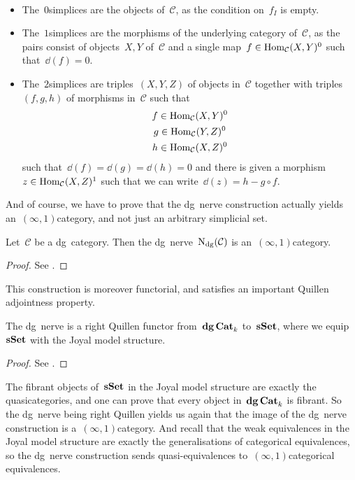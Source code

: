 \begin{example} {\ }
  \label{example:low-degree-interpretation}
  \begin{itemize}
    \item The~$0$\dash simplices are the objects of~$\mathcal{C}$, as the condition on~$f_I$ is empty.
    \item The~$1$\dash simplices are the morphisms of the underlying category of~$\mathcal{C}$, as the pairs consist of objects~$X,Y$ of~$\mathcal{C}$ and a single map~$f\in\mathrm{Hom}_{\mathcal{C}}(X,Y)^0$ such that~$\dd(f)=0$.
    \item The~$2$\dash simplices are triples~$(X,Y,Z)$ of objects in~$\mathcal{C}$ together with triples~$(f,g,h)$ of morphisms in~$\mathcal{C}$ such that
      \begin{equation}
        \begin{gathered}
          f\in\mathrm{Hom}_{\mathcal{C}}(X,Y)^0 \\
          g\in\mathrm{Hom}_{\mathcal{C}}(Y,Z)^0 \\
          h\in\mathrm{Hom}_{\mathcal{C}}(X,Z)^0 \\
        \end{gathered}
      \end{equation}
      such that~$\dd(f)=\dd(g)=\dd(h)=0$ and there is given a morphism~$z\in\mathrm{Hom}_{\mathcal{C}}(X,Z)^1$ such that we can write~$\dd(z)=h-g\circ f$.
  \end{itemize}
\end{example}
And of course, we have to prove that the dg~nerve construction actually yields an~$(\infty,1)$\dash category, and not just an arbitrary simplicial set.
\begin{proposition}
  Let~$\mathcal{C}$ be a dg~category. Then the dg~nerve~$\operatorname{N}_{\mathrm{dg}}(\mathcal{C})$ is an~$(\infty,1)$\dash category.
  \begin{proof}
    See \cite[proposition 1.3.1.10]{ha}.
  \end{proof}
\end{proposition}
This construction is moreover functorial, and satisfies an important Quillen adjointness property.
\begin{proposition}
  The dg~nerve is a right Quillen functor from~$\mathbf{dg\,Cat}_k$ to~$\mathbf{s\,\!\mathbf{Set}}$, where we equip~$\mathbf{s\,\!\mathbf{Set}}$ with the Joyal model structure.
  \begin{proof}
    See \cite[proposition 1.3.1.20]{ha}.
  \end{proof}
\end{proposition}
The fibrant objects of~$\mathbf{s\,\!\mathbf{Set}}$ in the Joyal model structure are exactly the quasicategories, and one can prove that every object in~$\mathbf{dg\,Cat}_k$ is fibrant. So the dg~nerve being right Quillen yields us again that the image of the dg~nerve construction is a~$(\infty,1)$\dash category. And recall that the weak equivalences in the Joyal model structure are exactly the generalisations of categorical equivalences, so the dg~nerve construction sends quasi-equivalences to~$(\infty,1)$\dash categorical equivalences.

